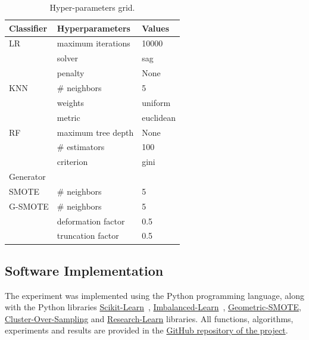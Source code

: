 \documentclass[parskip=full]{scrartcl}
\begin{document}
\begin{table}[H]
	\centering
	\begin{tabular}{lll}
		\toprule
		Classifier & Hyperparameters      & Values             \\
		\midrule
		LR         & maximum iterations   & 10000              \\
		           & solver               & sag                \\
                   & penalty              & None               \\
		KNN        & \# neighbors         & 5                  \\
                   & weights              & uniform            \\
                   & metric               & euclidean          \\
		RF         & maximum tree depth   & None               \\
		           & \# estimators        & 100                \\
                   & criterion            & gini               \\
		\toprule
		Generator  &                      &                    \\
		\midrule
		SMOTE      & \# neighbors         & 5                  \\
		G-SMOTE    & \# neighbors         & 5                  \\
                   & deformation factor   & 0.5                \\
                   & truncation factor    & 0.5                \\
		\bottomrule
	\end{tabular}
    \caption{\label{tab:grid}Hyper-parameters grid.}
\end{table}

\subsection{Software Implementation}

The experiment was implemented using the Python programming language, along
with the Python libraries
\href{https://scikit-learn.org/stable/}{Scikit-Learn}~\cite{Pedregosa2011},
\href{https://imbalanced-learn.org/en/stable/}{Imbalanced-Learn}~\cite{JMLR:v18:16-365},
\href{https://geometric-smote.readthedocs.io/en/latest/?badge=latest}{Geometric-SMOTE},
\href{https://cluster-over-sampling.readthedocs.io/en/latest/?badge=latest}{Cluster-Over-Sampling}
and
\href{https://research-learn.readthedocs.io/en/latest/?badge=latest}{Research-Learn}
libraries.  All functions, algorithms, experiments and results are provided in
the
\href{https://github.com/AlgoWit/publications/tree/master/remote-sensing/al-generator}{GitHub
repository of the project}.
\end{document}
